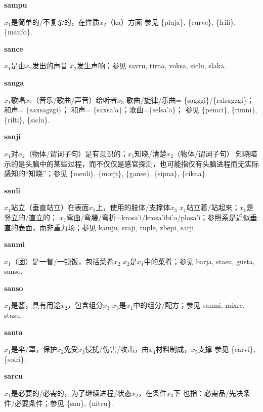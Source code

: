 \documentclass[notitlepage,twocolumn,a4paper,10pt]{book}
\begin{document}
{\sffamily\bfseries sampu}\enspace {\ttfamily\bfseries[sap]}  $x_1$是简单的\slash{}不复杂的，在性质$x_2$（ka）方面 \textemdash{} 参见 \{pluja\}, \{curve\}, \{frili\}, \{manfo\}.

{\sffamily\bfseries sance}\enspace {\ttfamily\bfseries[    sna]}  $x_1$是由$x_2$发出的声音 \textemdash{} $x_2$发生声响；参见 {savru}, {tirna}, {voksa}, {siclu}, {slaka}.

{\sffamily\bfseries sanga}\enspace {\ttfamily\bfseries[sag     sa'a]}  $x_1$歌唱$x_2$（音乐\slash{}歌曲\slash{}声音）给听者$x_3$ \textemdash{} 歌曲\slash{}旋律\slash{}乐曲= \{sagzgi\}\slash{}\{ralsagzgi\}；和声= \{saxsagzgi\}； 和声= \{saxsa'a\}；歌曲=\{selsa'a\}； 参见 \{pemci\}, \{rimni\}, \{rilti\}, \{siclu\}.

{\sffamily\bfseries sanji}\enspace {\ttfamily\bfseries[saj]}  $x_1$对$x_2$（物体\slash{}谓词子句）是有意识的；$x_1$知晓\slash{}清楚$x_2$（物体\slash{}谓词子句） \textemdash{} 知晓暗示的是头脑中的某些过程，而不仅仅是感官探测，也可能指仅有头脑进程而无实际感知的“知晓”；参见 \{menli\}, \{morji\}, \{ganse\}, \{sipna\}, \{cikna\}.

{\sffamily\bfseries sanli}\enspace {\ttfamily\bfseries[        sa'i]}  $x_1$站立（垂直站立）在表面$x_2$上，使用的肢体\slash{}支撑体$x_3$ \textemdash{} $x_1$站立着\slash{}站起来；$x_1$是竖立的\slash{}直立的； $x_1$弯曲\slash{}弯腰\slash{}弯折={krosa'i}\slash{}{krosa'ibi'o}\slash{}{plosa'i}；参照系是近似垂直的表面，而非重力场；参见 {kamju}, {sraji}, {tuple}, {zbepi}, {sarji}.

{\sffamily\bfseries sanmi}\enspace {\ttfamily\bfseries[        sai]}  $x_1$（团）是一餐\slash{}一顿饭，包括菜肴$x_2$ \textemdash{} $x_2$是$x_1$中的菜肴；参见 {barja}, {stasu}, {gusta}, {sanso}.

{\sffamily\bfseries sanso} $x_1$是酱，具有用途$x_2$，包含组分$x_3$ \textemdash{} $x_3$是$x_1$中的组分\slash{}配方；参见 {sanmi}, {mixre}, {stasu}.

{\sffamily\bfseries santa} $x_1$是伞\slash{}罩，保护$x_2$免受$x_3$侵扰\slash{}伤害\slash{}攻击，由$x_4$材料制成，$x_5$支撑 \textemdash{} 参见 \{carvi\}, \{solri\}.

{\sffamily\bfseries sarcu}\enspace {\ttfamily\bfseries[        sa'u]}  $x_1$是必要的\slash{}必需的，为了继续进程\slash{}状态$x_2$，在条件$x_3$下 \textemdash{} 也指：必需品\slash{}先决条件\slash{}必要条件；参见 \{sau\}, \{nitcu\}.
\end{document}
